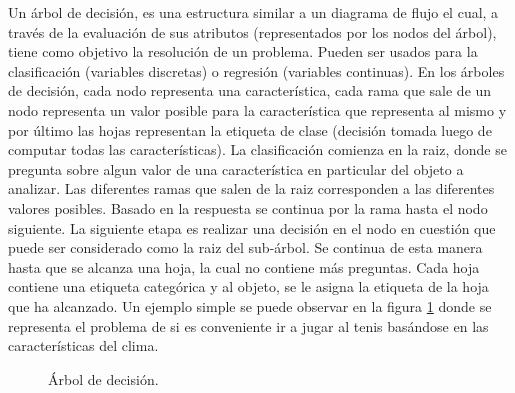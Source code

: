 	Un árbol de decisión, es una estructura similar a un diagrama de flujo el cual, a través de la evaluación de sus atributos (representados por los nodos del árbol), tiene como objetivo la resolución de un problema. Pueden ser usados para la clasificación (variables discretas) o regresión (variables continuas). En los árboles de decisión, cada nodo representa una característica, cada rama que sale de un nodo representa un valor posible para la característica que representa al mismo y por último las hojas representan la etiqueta de clase (decisión tomada luego de computar todas las características). La clasificación comienza en la raiz, donde se pregunta sobre algun valor de una característica en particular del objeto a analizar. Las diferentes ramas que salen de la  raiz corresponden a las diferentes valores posibles. Basado en la respuesta se continua por la rama hasta el nodo siguiente. La siguiente etapa es realizar una decisión en el nodo en cuestión que puede ser considerado como la raiz del sub-árbol. Se continua de esta manera hasta que se alcanza una hoja, la cual no contiene más preguntas. Cada hoja contiene una etiqueta categórica y al objeto, se le asigna la etiqueta de la hoja que ha alcanzado. Un ejemplo simple se puede observar en la figura \ref{fig: Arbol de decision} donde se representa el problema de si es conveniente ir a jugar al tenis basándose en las características del clima.
		\begin{figure}[htbp]
			\centering
			\caption{Árbol de decisión.}
			\label{fig: Arbol de decision}
		\end{figure} 
	
	
